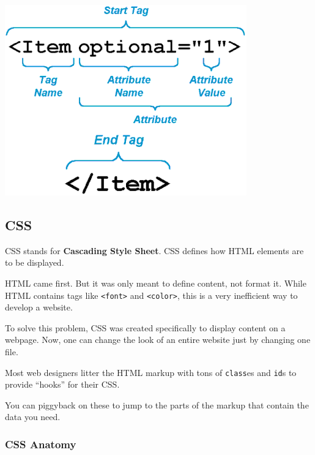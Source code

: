 \documentclass[]{book}
\begin{document}
\begin{center}\includegraphics[width=0.7\linewidth]{img/html-attributes} \end{center}

\hypertarget{css}{%
\subsection{CSS}\label{css}}

CSS stands for \textbf{Cascading Style Sheet}. CSS defines how HTML elements are to be displayed.

HTML came first. But it was only meant to define content, not format it. While HTML contains tags like \texttt{\textless{}font\textgreater{}} and \texttt{\textless{}color\textgreater{}}, this is a very inefficient way to develop a website.

To solve this problem, CSS was created specifically to display content on a webpage. Now, one can change the look of an entire website just by changing one file.

Most web designers litter the HTML markup with tons of \texttt{class}es and \texttt{id}s to provide ``hooks'' for their CSS.

You can piggyback on these to jump to the parts of the markup that contain the data you need.

\hypertarget{css-anatomy}{%
\subsubsection*{CSS Anatomy}\label{css-anatomy}}
\end{document}
